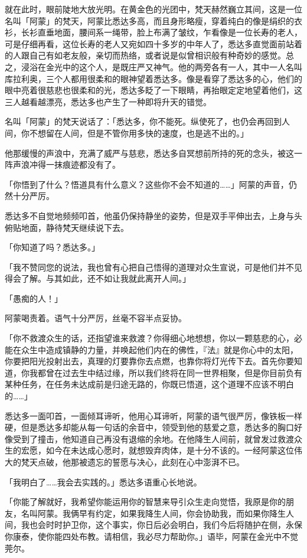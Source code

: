 \documentclass[12pt,twoside,openany]{book}
\begin{document}
就在此时，眼前陡地大放光明。在黄金色的光团中，梵天赫然巍立其间，这是一位名叫「阿蒙」的梵天，阿蒙比悉达多高，而且身形略瘦，穿着纯白的像是绢织的衣衫，长衫直垂地面，腰间系一绳带，脸上布满了皱纹，乍看像是一位长寿的老人，可是仔细再看，这位长寿的老人又宛如四十多岁的中年人了，悉达多直觉面前站着的人跟自己有如老友般，亲切而热络，或者说是似曾相识般有种奇妙的感觉。总之，浸浴在金光中的这个人，是既庄严又神气。他的两旁各有一人，其中一人名叫库拉利奥，三个人都用很柔和的眼神望着悉达多。像是看穿了悉达多的心，他们的眼中亮着很慈悲也很柔和的光，悉达多眨了一下眼睛，再抬眼定定地望着他们，这三人越看越漂亮，悉达多也产生了一种即将升天的错觉。

名叫「阿蒙」的梵天说话了：「悉达多，你不能死。纵使死了，也仍会再回到人间，你不想留在人间，但是不管你用多快的速度，也是逃不出的。」

他那缓慢的声浪中，充满了威严与慈悲，悉达多自冥想前所持的死的念头，被这一阵声浪冲得一抹痕迹都没有了。

「你悟到了什么？悟道具有什么意义？这些你不会不知道的……」阿蒙的声音，仍然十分严厉。

悉达多不自觉地频频叩首，他虽仍保持静坐的姿势，但是双手平伸出去，上身与头俯贴地面，静待梵天继续说下去。

「你知道了吗？悉达多。」

「我不赞同您的说法，我也曾有心把自己悟得的道理对众生宣说，可是他们并不见得会了解。与其如此，还不如让我就此离开人间。」

「愚痴的人！」

阿蒙喝责着。语气十分严厉，丝毫不容半点妥协。

「你不救渡众生的话，还指望谁来救渡？你得细心地想想，你以一颗慈悲的心，必能在众生中造成镇静的力量，并唤起他们内在的佛性，『法』就是你心中的太阳，你要把阳光投射出去，真理的灯要靠你去点燃，也靠你将灯光传下去。首先你要知道，你我都曾在过去生中结过缘，所以我们终将在同一世界相聚，但是你目前负有某种任务，在任务未达成前是归途无路的，你既已悟道，这个道理不应该不明白的……」

悉达多一面叩首，一面倾耳谛听，他用心耳谛听，阿蒙的语气很严厉，像铁板一样硬，但是悉达多却能从每一句话的余音中，领受到他的慈爱之意，悉达多的胸口好像受到了撞击，他知道自己再没有退缩的余地。在他降生人间前，就曾发过救渡众生的宏愿，如今在未达成心愿时，就想毁弃肉体，是十分不该的。一经阿蒙这位伟大的梵天点破，他那被遗忘的誓愿与决心，此刻在心中澎湃不已。

「我明白了……我会去实践的。」悉达多语重心长地说。

「你能了解就好，我希望你能运用你的智慧来导引众生走向觉悟，我原是你的朋友，名叫阿蒙。我俩早有约定，如果我降生人间，你会协助我，而如果你降生人间，我也会时时护卫你，这个事实，你日后必会明白，我们今后将随护在侧，永保你康泰，使你能四处布教。请相信，我必尽力帮助你。」语毕，阿蒙在金光中不觉莞尔。
\end{document}

